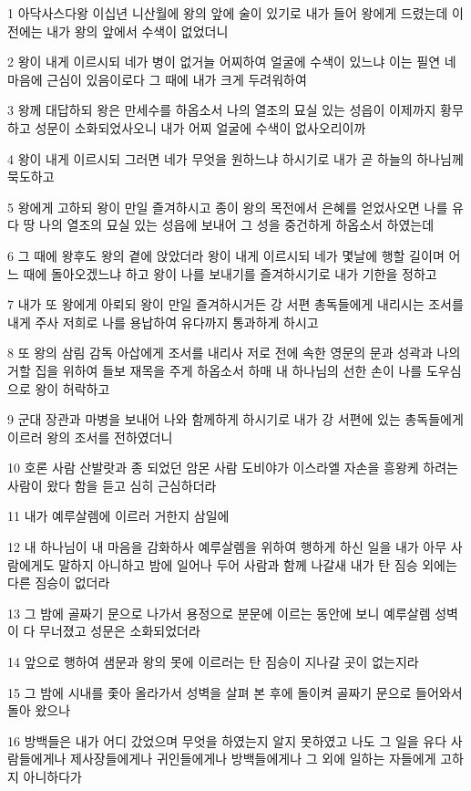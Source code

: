 \par 1 아닥사스다왕 이십년 니산월에 왕의 앞에 술이 있기로 내가 들어 왕에게 드렸는데 이전에는 내가 왕의 앞에서 수색이 없었더니
\par 2 왕이 내게 이르시되 네가 병이 없거늘 어찌하여 얼굴에 수색이 있느냐 이는 필연 네 마음에 근심이 있음이로다 그 때에 내가 크게 두려워하여
\par 3 왕께 대답하되 왕은 만세수를 하옵소서 나의 열조의 묘실 있는 성읍이 이제까지 황무하고 성문이 소화되었사오니 내가 어찌 얼굴에 수색이 없사오리이까
\par 4 왕이 내게 이르시되 그러면 네가 무엇을 원하느냐 하시기로 내가 곧 하늘의 하나님께 묵도하고
\par 5 왕에게 고하되 왕이 만일 즐겨하시고 종이 왕의 목전에서 은혜를 얻었사오면 나를 유다 땅 나의 열조의 묘실 있는 성읍에 보내어 그 성을 중건하게 하옵소서 하였는데
\par 6 그 때에 왕후도 왕의 곁에 앉았더라 왕이 내게 이르시되 네가 몇날에 행할 길이며 어느 때에 돌아오겠느냐 하고 왕이 나를 보내기를 즐겨하시기로 내가 기한을 정하고
\par 7 내가 또 왕에게 아뢰되 왕이 만일 즐겨하시거든 강 서편 총독들에게 내리시는 조서를 내게 주사 저희로 나를 용납하여 유다까지 통과하게 하시고
\par 8 또 왕의 삼림 감독 아삽에게 조서를 내리사 저로 전에 속한 영문의 문과 성곽과 나의 거할 집을 위하여 들보 재목을 주게 하옵소서 하매 내 하나님의 선한 손이 나를 도우심으로 왕이 허락하고
\par 9 군대 장관과 마병을 보내어 나와 함께하게 하시기로 내가 강 서편에 있는 총독들에게 이르러 왕의 조서를 전하였더니
\par 10 호론 사람 산발랏과 종 되었던 암몬 사람 도비야가 이스라엘 자손을 흥왕케 하려는 사람이 왔다 함을 듣고 심히 근심하더라
\par 11 내가 예루살렘에 이르러 거한지 삼일에
\par 12 내 하나님이 내 마음을 감화하사 예루살렘을 위하여 행하게 하신 일을 내가 아무 사람에게도 말하지 아니하고 밤에 일어나 두어 사람과 함께 나갈새 내가 탄 짐승 외에는 다른 짐승이 없더라
\par 13 그 밤에 골짜기 문으로 나가서 용정으로 분문에 이르는 동안에 보니 예루살렘 성벽이 다 무너졌고 성문은 소화되었더라
\par 14 앞으로 행하여 샘문과 왕의 못에 이르러는 탄 짐승이 지나갈 곳이 없는지라
\par 15 그 밤에 시내를 좇아 올라가서 성벽을 살펴 본 후에 돌이켜 골짜기 문으로 들어와서 돌아 왔으나
\par 16 방백들은 내가 어디 갔었으며 무엇을 하였는지 알지 못하였고 나도 그 일을 유다 사람들에게나 제사장들에게나 귀인들에게나 방백들에게나 그 외에 일하는 자들에게 고하지 아니하다가
